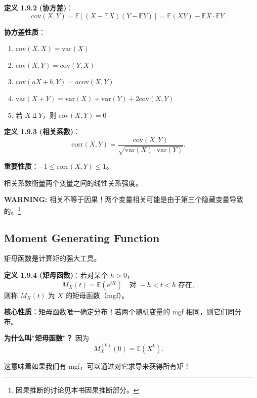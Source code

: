\begin{remark}
\textbf{定义 1.9.2 (协方差)}：
\[
\text{cov}(X, Y) = \mathbb{E}[(X - \mathbb{E}X)(Y - \mathbb{E}Y)] = \mathbb{E}(XY) - \mathbb{E}X \cdot \mathbb{E}Y.
\label{eq:covariance-def-ch1}
\]

\textbf{协方差性质}：
\begin{enumerate}
    \item $\text{cov}(X, X) = \text{var}(X)$
    \item $\text{cov}(X, Y) = \text{cov}(Y, X)$
    \item $\text{cov}(aX + b, Y) = a \text{cov}(X, Y)$
    \item $\text{var}(X + Y) = \text{var}(X) + \text{var}(Y) + 2\text{cov}(X, Y)$
    \item 若 $X \Perp Y$，则 $\text{cov}(X, Y) = 0$
\end{enumerate}
\end{remark}

\begin{remark}
\textbf{定义 1.9.3 (相关系数)}：
\[
\text{corr}(X, Y) = \frac{\text{cov}(X, Y)}{\sqrt{\text{var}(X) \cdot \text{var}(Y)}}.
\label{eq:correlation-def-ch1}
\]

\textbf{重要性质}：$-1 \leq \text{corr}(X, Y) \leq 1$。

相关系数衡量两个变量之间的线性关系强度。
\end{remark}

\textbf{WARNING:} 相关不等于因果！两个变量相关可能是由于第三个隐藏变量导致的。\footnote{因果推断的讨论见本书因果推断部分。}

\subsection{Moment Generating Function}

矩母函数是计算矩的强大工具。

\begin{remark}
\textbf{定义 1.9.4 (矩母函数)}：若对某个 $h > 0$，
\[
M_X(t) = \mathbb{E}(e^{tX}) \quad \text{对 } -h < t < h \text{ 存在},
\label{eq:mgf-def-ch1}
\]
则称 $M_X(t)$ 为 $X$ 的矩母函数（mgf）。
\end{remark}

\textbf{核心性质}：矩母函数唯一确定分布！若两个随机变量的 mgf 相同，则它们同分布。

\textbf{为什么叫"矩母函数"？} 因为
\[
M_X^{(k)}(0) = \mathbb{E}(X^k).
\label{eq:mgf-moments-ch1}
\]

这意味着如果我们有 mgf，可以通过对它求导来获得所有矩！

